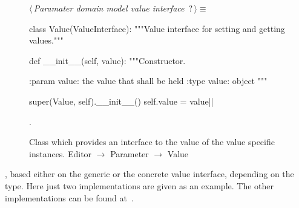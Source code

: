 \documentclass[%
    a4paper,    %
    justified,  %
    nobib,      %
    openany     %
]{tufte-book}
\makeatletter
\renewcommand{\label}[1]{\@tufte@label{##1}}%
\makeatother
\begin{document}
\begin{figure}
\begin{flushleft} \small
\begin{minipage}{\linewidth}\label{scrap131}\raggedright\small
{} $\langle\,${\itshape Paramater domain model value interface}\nobreak\ {\footnotesize {?}}$\,\rangle\equiv$
\vspace{-1ex}
\begin{pythoncode}
class Value(ValueInterface):
    """Value interface for setting and getting values."""

    def __init__(self, value):
        """Constructor.

        :param value: the value that shall be held
        :type  value: object
        """

        super(Value, self).__init__()
        self.value = value|\NWsep|
\end{pythoncode}
\vspace{1.5ex}
\footnotesize
\begin{list}{}{\setlength{\itemsep}{-\parsep}\setlength{\itemindent}{-\leftmargin}}
\item {\NWtxtMacroNoRef}.

\item{}
\end{list}
\end{minipage}\vspace{4ex}
\end{flushleft}
\caption{Class which provides an interface to the value of the value specific
  instances.
  \newline{}\newline{}Editor $\rightarrow$ Parameter $\rightarrow$
  Value}
\label{editor:lst:parameter:value}
\end{figure}

, based either on the
generic or the concrete value interface, depending on the type. Here just two
implementations are given as an example. The other implementations can be found
at~.
\end{document}
